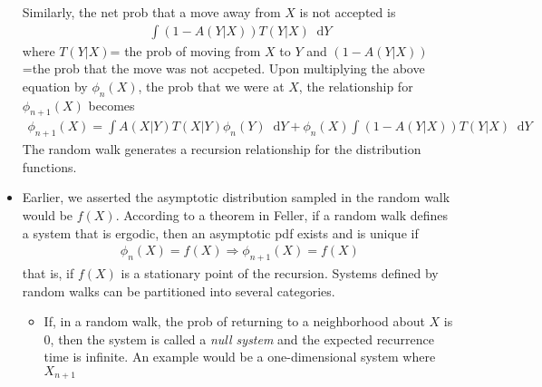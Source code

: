 \documentclass[twoside,english]{uiofysmaster}
\newcommand*\dif{\mathop{}\!\mathrm{d}}
\begin{document}
\begin{itemize}
	Similarly, the net prob that a move away from $X$ is not accepted is
	\begin{align}
		\int (1-A(Y|X)) T(Y|X) \dif Y
	\end{align}
	where $T(Y|X)$= the prob of moving from $X$ to $Y$ and $(1-A(Y|X))$ =the prob that the move was not accpeted. Upon multiplying the above equation by $\phi_n (X)$, the prob that we were at $X$, the relationship for $\phi_{n+1} (X)$ becomes
	\begin{align}
		\phi_{n+1} (X) = \int A(X|Y) T(X|Y) \phi_n (Y) \dif Y
		+ \phi_n(X) \int (1-A(Y|X)) T(Y|X) \dif Y
	\end{align}
	The random walk generates a recursion relationship for the distribution functions.
	\item Earlier, we asserted the asymptotic distribution sampled in the random walk would be $f(X)$. According to a theorem in Feller, if a random walk defines a system that is ergodic, then an asymptotic pdf exists and is unique if
	\begin{align}
		\phi_n (X) = f(X) \Rightarrow \phi_{n+1} (X) = f(X)
	\end{align}
	that is, if $f(X)$ is a stationary point of the recursion. Systems defined by random walks can be partitioned into several categories.
	\begin{itemize}
		\item If, in a random walk, the prob of returning to a neighborhood about $X$ is 0, then the system is called a \textit{null system} and the expected recurrence time is infinite. An example would be a one-dimensional system where $X_{n+1}$ 
	\end{itemize}
\end{itemize}
 \cite{Kalos2008}
\end{document}
